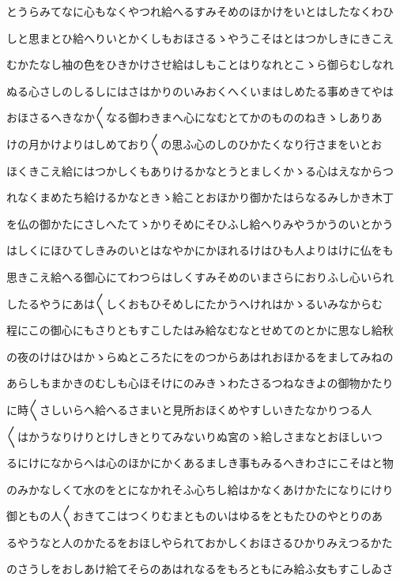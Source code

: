 \documentclass[a4paper,11pt,landscape]{ltjtarticle}
\begin{document}
とうらみてなに心もなくやつれ給へるすみそめのほかけをいとはしたなくわひ
\par\medskip
しと思まとひ給へりいとかくしもおほさるゝやうこそはとはつかしきにきこえ
\par\medskip
むかたなし袖の色をひきかけさせ給はしもことはりなれとこゝら御らむしなれ
\par\medskip
ぬる心さしのしるしにはさはかりのいみおくへくいまはしめたる事めきてやは
\par\medskip
おほさるへきなか〱なる御わきまへ心になむとてかのもののねきゝしありあ
\par\medskip
けの月かけよりはしめており〱の思ふ心のしのひかたくなり行さまをいとお
\par\medskip
ほくきこえ給にはつかしくもありけるかなとうとましくかゝる心はえなからつ
\par\medskip
れなくまめたち給けるかなときゝ給ことおほかり御かたはらなるみしかき木丁
\par\medskip
を仏の御かたにさしへたてゝかりそめにそひふし給へりみやうかうのいとかう
\par\medskip
はしくにほひてしきみのいとはなやかにかほれるけはひも人よりはけに仏をも
\par\medskip
思きこえ給へる御心にてわつらはしくすみそめのいまさらにおりふし心いられ
\par\medskip
したるやうにあは〱しくおもひそめしにたかうへけれはかゝるいみなからむ
\par\medskip
程にこの御心にもさりともすこしたはみ給なむなとせめてのとかに思なし給秋
\par\medskip
の夜のけはひはかゝらぬところたにをのつからあはれおほかるをましてみねの
\par\medskip
あらしもまかきのむしも心ほそけにのみきゝわたさるつねなきよの御物かたり
\par\medskip
に時〱さしいらへ給へるさまいと見所おほくめやすしいきたなかりつる人
\par\medskip
〱はかうなりけりとけしきとりてみないりぬ宮のゝ給しさまなとおほしいつ
\par\medskip
るにけになからへは心のほかにかくあるましき事もみるへきわさにこそはと物
\par\medskip
のみかなしくて水のをとになかれそふ心ちし給はかなくあけかたになりにけり
\par\medskip
御ともの人〱おきてこはつくりむまとものいはゆるをともたひのやとりのあ
\par\medskip
るやうなと人のかたるをおほしやられておかしくおほさるひかりみえつるかた
\par\medskip
のさうしをおしあけ給てそらのあはれなるをもろともにみ給ふ女もすこしゐさ
\end{document}
